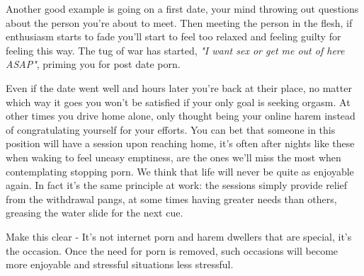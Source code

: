 \documentclass[easypeasy.tex]{subfiles}
\begin{document}
Another good example is going on a first date, your mind throwing out questions about the person you're about to meet. Then meeting the person in the flesh, if enthusiasm starts to fade you'll start to feel too relaxed and feeling guilty for feeling this way. The tug of war has started, \textit{"I want sex or get me out of here ASAP"}, priming you for post date porn.

Even if the date went well and hours later you're back at their place, no matter which way it goes you won't be satisfied if your only goal is seeking orgasm. At other times you drive home alone, only thought being your online harem instead of congratulating yourself for your efforts. You can bet that someone in this position will have a session upon reaching home, it's often after nights like these when waking to feel uneasy emptiness, are the ones we'll miss the most when contemplating stopping porn. We think that life will never be quite as enjoyable again. In fact it's the same principle at work: the sessions simply provide relief from the withdrawal pangs, at some times having greater needs than others, greasing the water slide for the next cue.

Make this clear - It's not internet porn and harem dwellers that are special, it's the occasion. Once the need for porn is removed, such occasions will become more enjoyable and stressful situations less stressful.
\end{document}
